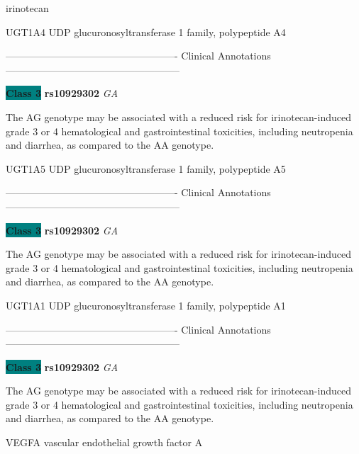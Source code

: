 \documentclass{resume} %
\begin{document}
\begin{rSection}{ irinotecan }
\begin{rSubsection}{ UGT1A4 }{ UDP glucuronosyltransferase 1 family, polypeptide A4 }{}{}
\item[] ---------------------------------------------------- Clinical Annotations -----------------------------------------------------\newline
\item \textbf{\colorbox{teal} {Class 3}} \textbf{ rs10929302 } \textit{ GA }
\item[] The AG genotype may be associated with a reduced risk for irinotecan-induced grade 3 or 4 hematological and gastrointestinal toxicities, including neutropenia and diarrhea, as compared to the AA genotype. 
\end{rSubsection}\begin{rSubsection}{ UGT1A5 }{ UDP glucuronosyltransferase 1 family, polypeptide A5 }{}{}
\item[]

\item[] ---------------------------------------------------- Clinical Annotations -----------------------------------------------------\newline
\item \textbf{\colorbox{teal} {Class 3}} \textbf{ rs10929302 } \textit{ GA }
\item[] The AG genotype may be associated with a reduced risk for irinotecan-induced grade 3 or 4 hematological and gastrointestinal toxicities, including neutropenia and diarrhea, as compared to the AA genotype. 
\end{rSubsection}\begin{rSubsection}{ UGT1A1 }{ UDP glucuronosyltransferase 1 family, polypeptide A1 }{}{}
\item[]

\item[] ---------------------------------------------------- Clinical Annotations -----------------------------------------------------\newline
\item \textbf{\colorbox{teal} {Class 3}} \textbf{ rs10929302 } \textit{ GA }
\item[] The AG genotype may be associated with a reduced risk for irinotecan-induced grade 3 or 4 hematological and gastrointestinal toxicities, including neutropenia and diarrhea, as compared to the AA genotype. 
\end{rSubsection}\begin{rSubsection}{ VEGFA }{ vascular endothelial growth factor A }{}{}
\item[]


\end{rSubsection}
\end{rSection}
\end{document}

